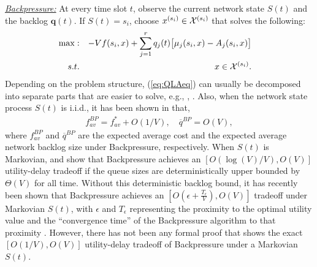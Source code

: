 \documentclass[journal]{IEEEtran}
\newcommand{\bv}[1]{{\boldsymbol{#1} }}
\newcommand{\script}[1]{{{\cal{#1} }}}
\begin{document}
\underline{\emph{Backpressure:}} At every time slot $t$, observe the current network state $S(t)$ and the backlog $\bv{q}(t)$. If $S(t)=s_i$, choose $x^{(s_i)}\in\script{X}^{(s_i)}$ that solves the following: 
\vspace{-.15in}
\begin{eqnarray}
\hspace{-.3in}\max: && -Vf(s_i, x)+\sum_{j=1}^{r}q_j(t)\big[\mu_j(s_i, x)-A_j(s_i, x)\big]\label{eq:QLAeq}\\
s.t. && x\in\script{X}^{(s_i)}.\nonumber
\end{eqnarray}
Depending on the problem structure, (\ref{eq:QLAeq}) can usually be decomposed into separate parts that are easier to solve, e.g., \cite{huangneelypricing}, \cite{rahulneelycognitive}. 
Also, when the network state process $S(t)$ is i.i.d., it has been shown in \cite{neelynowbook} that, 
\begin{eqnarray}
f_{av}^{BP}=f^*_{av}+O(1/V),\quad \overline{q}^{BP}=O(V),\label{eq:qla_performance}
\end{eqnarray}
where $f_{av}^{BP}$ and $\overline{q}^{BP}$ are the expected average cost and the expected average network backlog size under Backpressure, respectively. 
When $S(t)$ is Markovian, \cite{huangneelypricing} and \cite{rahulneelycognitive} show that Backpressure achieves an $[O(\log(V)/V), O(V)]$ utility-delay tradeoff if the queue sizes are deterministically upper bounded by $\Theta(V)$ for all time. Without this deterministic backlog bound, it has recently been shown that Backpressure achieves an $[O(\epsilon+\frac{T_{\epsilon}}{V}), O(V)]$ tradeoff under Markovian $S(t)$, with $\epsilon$ and $T_{\epsilon}$ representing the proximity to the optimal utility value and the ``convergence time'' of the Backpressure algorithm to that proximity \cite{neely_queuestability10}. However, there has not been any formal proof that shows the exact $[O(1/V), O(V)]$ utility-delay tradeoff of Backpressure under a Markovian $S(t)$. 


\end{document}
